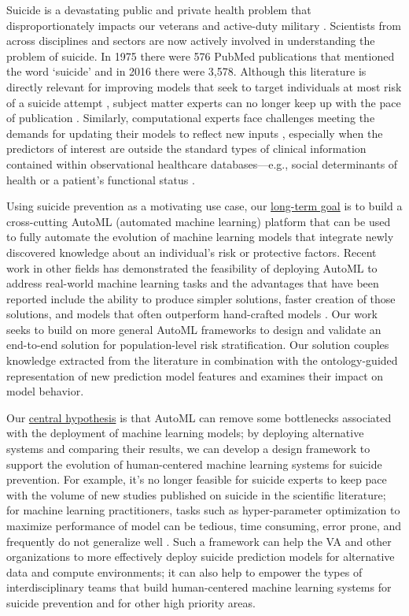 \noindent Suicide is a devastating public and private health problem that disproportionately impacts our veterans \cite{} and active-duty military \cite{}.  Scientists from across disciplines and sectors are now actively involved in understanding the problem of suicide. In 1975 there were 576 PubMed publications that mentioned the word `suicide' and in 2016 there were 3,578.  Although this literature is directly relevant for improving models that seek to target individuals at most risk of a suicide attempt \cite{}, subject matter experts can no longer keep up with the pace of publication \cite{cohen2014biomedical}.  Similarly, computational experts face challenges meeting the demands for updating their models to reflect new inputs \cite{wijeratne_feature_2017}, especially when the predictors of interest are outside the standard types of clinical information contained within observational healthcare databases---e.g., social determinants of health or a patient's functional status \cite{gonzalez-hernandez_capturing_2017}.

Using suicide prevention as a motivating use case, our \underline{long-term goal} is to build a cross-cutting  AutoML (automated machine learning) platform that can be used to fully automate the evolution of machine learning models that integrate newly discovered knowledge about an individual's risk or protective factors.  Recent work in other fields has demonstrated the feasibility of deploying AutoML to address real-world machine learning tasks and the advantages that have been reported include the ability to produce simpler solutions, faster creation of those solutions, and models that often outperform hand-crafted models \cite{}.  Our work seeks to build on more general AutoML frameworks to design and validate an end-to-end solution for population-level risk stratification.  Our solution couples knowledge extracted from the literature in combination with the ontology-guided representation of new prediction model features and examines their impact on model behavior.  

Our \underline{central hypothesis} is that AutoML can remove some bottlenecks associated with the deployment of machine learning models; by deploying alternative systems and comparing their results, we can develop a design framework to support the evolution of human-centered machine learning systems for suicide prevention.   For example, it's no longer feasible for suicide experts to keep pace with the volume of new studies published on suicide in the scientific literature; for machine learning practitioners, tasks such as hyper-parameter optimization to maximize performance of model can be tedious, time consuming,  error prone, and frequently do not generalize well \cite{davidhand,coref,stephenwu}.  Such a framework can help the VA and other organizations to more effectively deploy suicide prediction models for alternative data and compute environments; it can also help to empower the types of interdisciplinary teams that build human-centered machine learning systems for suicide prevention and for other high priority areas.

